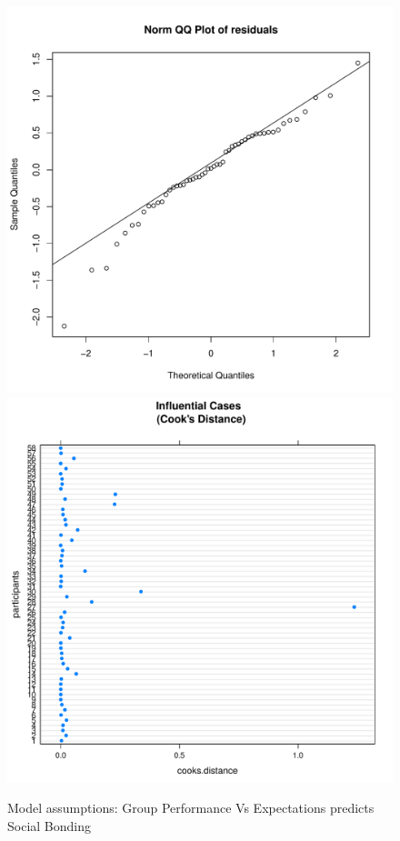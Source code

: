 \begin{CJK}{UTF8}{gbsn}
\begin{figure}[htbp]
    \includegraphics[scale =.4]{images/TEM3QQNorm.pdf}
    \includegraphics[scale =.4]{images/TEM3CooksD.pdf}
    \caption{Model assumptions: Group Performance Vs Expectations predicts Social Bonding}
    \label{fig:M3Assumptions}
\end{figure}



\end{CJK}
